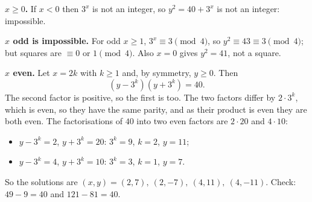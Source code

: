 \textbf{$x\ge0$.} If $x<0$ then $3^x$ is not an integer, so $y^2=40+3^x$ is not an integer: impossible.

\textbf{$x$ odd is impossible.} For odd $x\ge1$, $3^x\equiv3\pmod4$, so $y^2\equiv43\equiv3\pmod4$; but squares are $\equiv0$ or $1\pmod4$. Also $x=0$ gives $y^2=41$, not a square.

\textbf{$x$ even.} Let $x=2k$ with $k\ge1$ and, by symmetry, $y\ge0$. Then
\[
(y-3^k)(y+3^k)=40 .
\]
The second factor is positive, so the first is too. The two factors differ by $2\cdot3^k$, which is even, so they have the same parity, and as their product is even they are both even. The factorisations of $40$ into two even factors are $2\cdot20$ and $4\cdot10$:
\begin{itemize}
\item $y-3^k=2$, $y+3^k=20$: $3^k=9$, $k=2$, $y=11$;
\item $y-3^k=4$, $y+3^k=10$: $3^k=3$, $k=1$, $y=7$.
\end{itemize}
So the solutions are $\boxed{(x,y)=(2,7),\ (2,-7),\ (4,11),\ (4,-11)}$. Check: $49-9=40$ and $121-81=40$.
